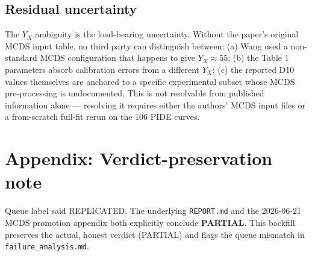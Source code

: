 \documentclass[11pt]{article}
\begin{document}
\subsection{Residual uncertainty}
The $Y_X$ ambiguity is the load-bearing uncertainty. Without the paper's original MCDS input table, no third party can distinguish between: (a) Wang used a non-standard MCDS configuration that happens to give $Y_X \approx 55$; (b) the Table 1 parameters absorb calibration errors from a different $Y_X$; (c) the reported D10 values themselves are anchored to a specific experimental subset whose MCDS pre-processing is undocumented. This is not resolvable from published information alone --- resolving it requires either the authors' MCDS input files or a from-scratch full-fit rerun on the 106 PIDE curves.



\section*{Appendix: Verdict-preservation note}
Queue label said REPLICATED. The underlying \texttt{REPORT.md} and the 2026-06-21 MCDS promotion appendix both explicitly conclude \textbf{PARTIAL}. This backfill preserves the actual, honest verdict (PARTIAL) and flags the queue mismatch in \texttt{failure\_analysis.md}.
\end{document}
